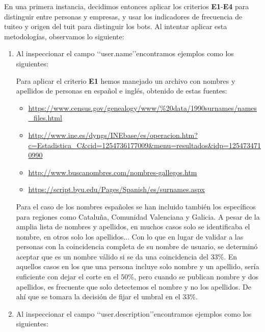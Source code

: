 En una primera instancia, decidimos entonces aplicar los criterios {\bf E1}-{\bf E4}
para distinguir entre personas y empresas, y usar los indicadores de frecuencia de
tuiteo y origen del tuit para distinguir los bots. 
Al intentar aplicar esta metodologías, observamos lo siguiente:
\begin{enumerate}
\item Al inspeccionar el campo \lq\lq user.name\rq\rq encontramos ejemplos como
los siguientes:


Para aplicar el criterio {\bf E1} hemos manejado un archivo con nombres y apellidos 
de personas en español e inglés, obtenido de estas fuentes:
\begin{itemize}
\item\url{ https://www.census.gov/genealogy/www/%20data/1990surnames/names_files.html }
\item\url{
http://www.ine.es/dyngs/INEbase/es/operacion.htm?c=Estadistica_C&cid=1254736177009&menu=resultados&idp=1254734710990 }
\item\url{http://www.buscanombres.com/nombres-gallegos.htm }
\item\url{https://script.byu.edu/Pages/Spanish/es/surnames.aspx }
\end{itemize}
Para el caso de los nombres españoles se han incluido también los específicos para regiones como Cataluña, Comunidad Valenciana y Galicia. A pesar de la amplia lista de nombres y apellidos,
en muchos casos solo se identificaba el nombre, en otros solo los apellidos... Con lo que en lugar de validar a las personas con la coincidencia completa de su nombre de usuario, se determinó 
aceptar que es un nombre válido si se da una coincidencia del $33$\%. En aquellos casos en los que una 
persona incluye solo nombre y un apellido, sería suficiente con dejar el corte en el $50$\%,
pero cuando se publican nombre y dos apellidos,  es frecuente que solo detectemos el nombre y no los apellidos. De ahí que se tomara la decisión de fijar el umbral en el $33$\%.

\item Al inspeccionar el campo \lq\lq user.description\rq\rq encontramos ejemplos como
los siguientes:



\end{enumerate}
